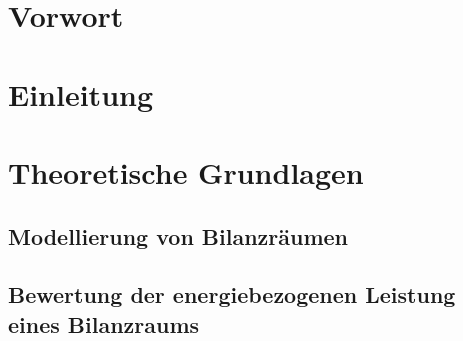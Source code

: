 \documentclass[a4paper,10pt,twoside]{report}
\begin{document}
\chapter*{Vorwort}
\tableofcontents

\chapter{Einleitung}
\setcounter{page}{1}














\chapter{Theoretische Grundlagen}
\section{Modellierung von Bilanzräumen}






\section{Bewertung der energiebezogenen Leistung eines Bilanzraums}






\end{document}
